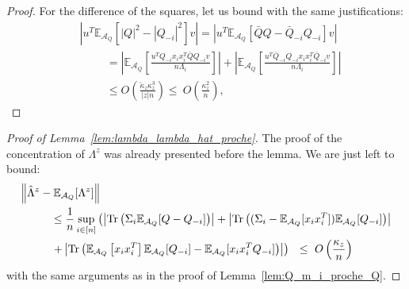 \documentclass[a4papaer, titlepage]{book}
\begin{document}
\begin{proof}
   For the difference of the squares, let us bound with the same justifications:
  \begin{align*}
    &\left\vert u^T \mathbb E_{\mathcal A_Q}[|Q|^2-|Q_{-i}|^2]v\right\vert = \left\vert u^T \mathbb E_{\mathcal A_Q}[\bar Q Q-  \bar Q_{-i}Q_{-i}]v\right\vert\\
    &\hspace{1cm}= \left\vert\mathbb E_{\mathcal A_Q} \left[\frac{u^TQ_{-i}x_i x_i^T\bar QQ_{-i}v}{n\Lambda_i}\right]\right\vert + \left\vert\mathbb E_{\mathcal A_Q} \left[\frac{u^T \bar Q_{-i}Q_{-i}x_i x_i^T\bar Q_{-i}v}{n\Lambda_i}\right]\right\vert \\
    &\hspace{1cm}\leq O \left(\frac{\check\kappa_z\kappa_z^3}{|z| n}\right)
    \leq \ O \left(\frac{\kappa_z^2}{n}\right),
  \end{align*}
\end{proof}
\begin{proof}[Proof of Lemma~\ref{lem:lambda_lambda_hat_proche}]
The proof of the concentration of $\Lambda^z$ was already presented before the lemma. We are just left to bound:
\begin{align}\label{eq:borne_hlambda_Elambda}
  &\left\Vert \hat \Lambda^z - \mathbb E_{\mathcal A_Q}[\Lambda^z]\right\Vert \nonumber \\
  &\hspace{1cm}\leq \frac{1}{n}\sup_{i\in [n]} \left( \left\vert \operatorname{Tr} \left(\Sigma_i \mathbb E_{\mathcal A_Q}[Q - Q_{-i}] \right)\right\vert + \left\vert \operatorname{Tr} \left((\Sigma_i- \mathbb E_{\mathcal A_Q}[x_ix_i^T]) \mathbb E_{\mathcal A_Q}[Q_{-i}] \right)\right\vert \right.\nonumber\\
  &\hspace{1cm}\left.+ \left\vert  \operatorname{Tr} \left(\mathbb E_{\mathcal A_Q} \left[x_i x_i^T\right]\mathbb E_{\mathcal A_Q}[Q_{-i}] -\mathbb E_{\mathcal A_Q}[x_ix_i^T Q_{-i}]\right)\right\vert \right)\ \
  \leq  \ O \left(\frac{\kappa_z}{n} \right)
\end{align}
with the same arguments as in the proof of Lemma~\ref{lem:Q_m_i_proche_Q}.
\end{proof}
\end{document}
